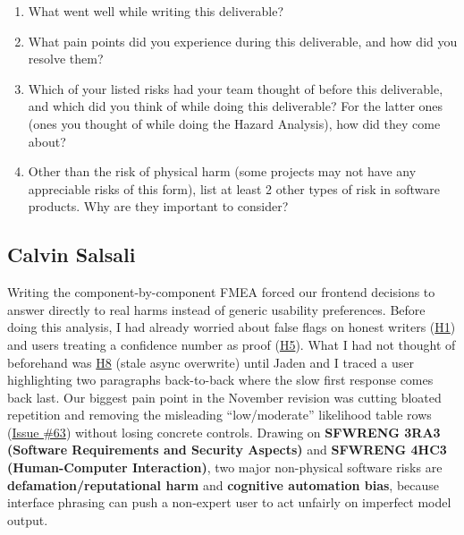 \documentclass[11pt]{article}
\begin{document}


\begin{enumerate}
    \item What went well while writing this deliverable?
    \item What pain points did you experience during this deliverable, and how did you resolve them?
    \item Which of your listed risks had your team thought of before this deliverable, and which did you think of while doing this deliverable? For the latter ones (ones you thought of while doing the Hazard Analysis), how did they come about?
    \item Other than the risk of physical harm (some projects may not have any appreciable risks of this form), list at least 2 other types of risk in software products. Why are they important to consider?
\end{enumerate}

\subsection*{Calvin Salsali}
Writing the component-by-component FMEA forced our frontend decisions to answer directly to real harms instead of generic usability preferences. Before doing this analysis, I had already worried about false flags on honest writers (\hyperref[haz:H1]{H1}) and users treating a confidence number as proof (\hyperref[haz:H5]{H5}). What I had not thought of beforehand was \hyperref[haz:H8]{H8} (stale async overwrite) until Jaden and I traced a user highlighting two paragraphs back-to-back where the slow first response comes back last. Our biggest pain point in the November revision was cutting bloated repetition and removing the misleading ``low/moderate'' likelihood table rows (\href{https://github.com/richy1337/Verity/issues/63}{Issue \#63}) without losing concrete controls. Drawing on \textbf{SFWRENG 3RA3 (Software Requirements and Security Aspects)} and \textbf{SFWRENG 4HC3 (Human-Computer Interaction)}, two major non-physical software risks are \textbf{defamation/reputational harm} and \textbf{cognitive automation bias}, because interface phrasing can push a non-expert user to act unfairly on imperfect model output.
\end{document}

